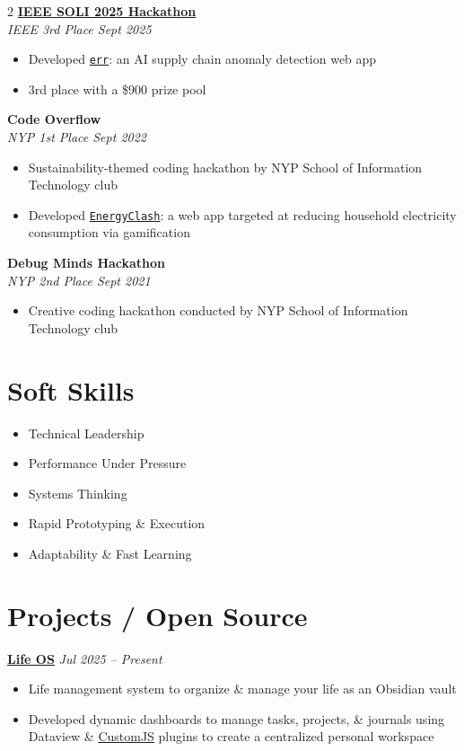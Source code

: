 \documentclass[a4paper,11pt]{article}
\newcommand{\entryHeader}[2]{\noindent\textbf{#1} \\ \textit{#2}}
\newcommand{\singleEntry}[2]{\noindent\textbf{#1} \hfill \textit{#2}}
\begin{document}
\begin{multicols}{2}
\smallskip
\entryHeader{\href{https://ieee-soli.org/2025/program/hackathon-challenge}{IEEE SOLI 2025 Hackathon}}{IEEE \hfill 3rd Place \textbar{} Sept 2025}
\begin{itemize}
    \item Developed \href{https://github.com/adoreblvnk/err}{\texttt{err}}: an AI supply chain anomaly detection web app
    \item 3rd place with a \$900 prize pool
\end{itemize}

\smallskip
\entryHeader{Code Overflow}{NYP \hfill 1st Place \textbar{} Sept 2022}
\begin{itemize}
    \item Sustainability-themed coding hackathon by NYP School of Information Technology club
    \item Developed \href{https://github.com/adoreblvnk/EnergyClash}{\texttt{EnergyClash}}: a web app targeted at reducing household electricity consumption via gamification
\end{itemize}

\smallskip
\entryHeader{Debug Minds Hackathon}{NYP \hfill 2nd Place \textbar{} Sept 2021}
\begin{itemize}
    \item Creative coding hackathon conducted by NYP School of Information Technology club
\end{itemize}

\section*{Soft Skills}
\begin{itemize}
    \item Technical Leadership
    \item Performance Under Pressure
    \item Systems Thinking
    \item Rapid Prototyping \& Execution
    \item Adaptability \& Fast Learning
\end{itemize}

\columnbreak

\section*{Projects / Open Source}

\singleEntry{\href{https://github.com/adoreblvnk/life_os}{Life OS}}{Jul 2025 -- Present}
\begin{itemize}
    \item Life management system to organize \& manage your life as an Obsidian vault
    \item Developed dynamic dashboards to manage tasks, projects, \& journals using Dataview \& \href{https://github.com/saml-dev/obsidian-custom-js}{CustomJS} plugins to create a centralized personal workspace
\end{itemize}


\end{multicols}
\end{document}
